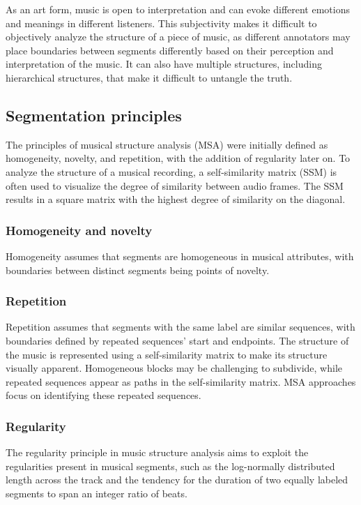 As an art form, music is open to interpretation and can evoke different emotions and meanings in different listeners. This subjectivity makes it difficult to objectively analyze the structure of a piece of music, as different annotators may place boundaries between segments differently based on their perception and interpretation of the music. It can also have multiple structures, including hierarchical structures, that make it difficult to untangle the truth.

\subsection{Segmentation principles}
The principles of musical structure analysis (MSA) were initially defined as homogeneity, novelty, and repetition, with the addition of regularity later on. To analyze the structure of a musical recording, a self-similarity matrix (SSM) is often used to visualize the degree of similarity between audio frames. The SSM results in a square matrix with the highest degree of similarity on the diagonal.

\subsubsection{Homogeneity and novelty}
Homogeneity assumes that segments are homogeneous in musical attributes, with boundaries between distinct segments being points of novelty. 

\subsubsection{Repetition}
Repetition assumes that segments with the same label are similar sequences, with boundaries defined by repeated sequences' start and endpoints. The structure of the music is represented using a self-similarity matrix to make its structure visually apparent. Homogeneous blocks may be challenging to subdivide, while repeated sequences appear as paths in the self-similarity matrix. MSA approaches focus on identifying these repeated sequences.

\subsubsection{Regularity}
The regularity principle in music structure analysis aims to exploit the regularities present in musical segments, such as the log-normally distributed length across the track and the tendency for the duration of two equally labeled segments to span an integer ratio of beats.

